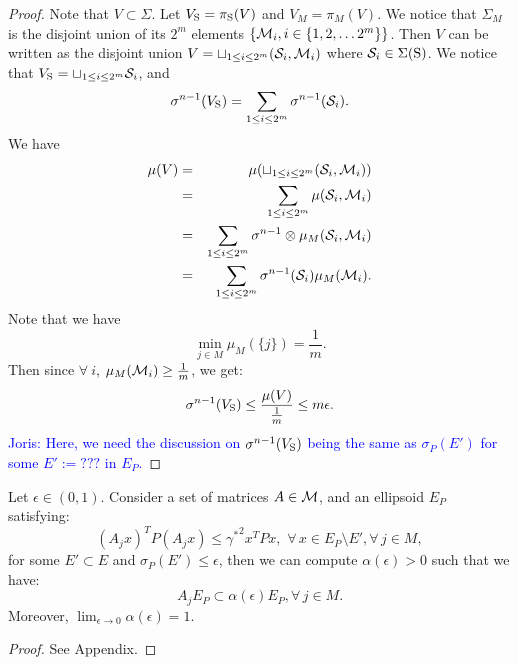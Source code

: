 \begin{proof}
Note that $V \subset \Sigma$. Let $V_{\text{S}} = \pi_{\text{S}}(V)$ and $V_M = \pi_M (V)$. We notice that $\Sigma_M$ is the disjoint union of its $2^m$ elements $\{\mathcal{M}_i, i \in \{1,2, \ldots 2^m\} \}$. Then $V$ can be written as the disjoint union $V = \sqcup_{1 \leq i \leq 2^m} (\mathcal{S}_i, \mathcal{M}_i)$ where $\mathcal{S}_i \in \Sigma(\text{S})$. We notice that 
$V_{\text{S}} = \sqcup_{1 \leq i \leq 2^m} \mathcal{S}_i$, 
and
\begin{equation*}
\sigma^{n-1} (V_{\text{S}}) = \sum_{1 \leq i \leq 2^m} \sigma^{n-1} (\mathcal{S}_i).
\end{equation*}
We have 
\begin{eqnarray*}
\mu(V) &=& \mu(\sqcup_{1 \leq i \leq 2^m} (\mathcal{S}_i, \mathcal{M}_i)) \\
&=& \sum_{1 \leq i \leq 2^m} \mu(\mathcal{S}_i, \mathcal{M}_i) \\
 &=& \sum_{1 \leq i \leq 2^m} \sigma^{n-1} \otimes \mu_M (\mathcal{S}_i, \mathcal{M}_i) \\
 & = &\sum_{1 \leq i \leq 2^m} \sigma^{n-1}(\mathcal{S}_i) \mu_M (\mathcal{M}_i).
\end{eqnarray*}
Note that we have $$\min_{j \in M} \mu_M(\{j\}) = \frac{1}{m}.$$ Then since $ \forall \ i$, $\mu_M(\mathcal{M}_i) \geq \frac{1}{m}$, we get:
\begin{equation}
\sigma^{n-1}(V_{\text{S}}) \leq \frac{\mu(V)}{\frac{1}{m}} \leq m \epsilon.
\end{equation}
\textcolor{blue}{Joris: Here, we need the discussion on $\sigma^{n-1}(V_{\text{S}})$ being the same as $\sigma_P(E')$ for some $E':=???$ in $E_P$.}
\end{proof}

\begin{theorem}\label{thm:mainTheorem1}Let $\epsilon \in (0,1)$. Consider a set of matrices $A \in \mathcal{M}$, and an ellipsoid $E_P$ satisfying:
\begin{equation}(A_j x)^TP(A_j x) \leq {\gamma^*}^2x^TPx,\,\, \forall\, x \in E_P \setminus E', \forall\, j \in M, \end{equation}
for some $E' \subset E$ and $\sigma_P(E') \leq \epsilon$, then we can compute $\alpha(\epsilon) > 0$ such that we have:
\begin{equation}\label{eqn:contractionEllipsoid}A_j E_P \subset \alpha(\epsilon)E_P, \forall\, j \in M.
\end{equation}
Moreover, $\lim_{\epsilon \to 0} \alpha(\epsilon) = 1$.
\end{theorem}

\begin{proof}See Appendix.
\end{proof}

